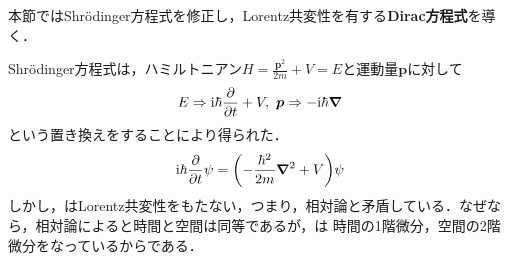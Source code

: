 \documentclass{report}
\begin{document}
本節ではShrödinger方程式を修正し，Lorentz共変性を有する\textbf{Dirac方程式}を導く．

Shrödinger方程式は，ハミルトニアン$H=\frac{\bm{p}^2}{2m} + V=E$と運動量$\bm{p}$に対して
\begin{align}
  E \Rightarrow \mathrm{i}\hbar\frac{\partial}{\partial t} + V,\ \bm{p} \Rightarrow -\mathrm{i}\hbar \grad 
\end{align}
という置き換えをすることにより得られた．
\begin{align}
  \mathrm{i}\hbar \frac{\partial}{\partial t}\psi = \qty(-\frac{\hbar^2}{2m}\grad^2 + V)\psi   \label{TDSE}
\end{align}
しかし，はLorentz共変性をもたない，つまり，相対論と矛盾している．なぜなら，相対論によると時間と空間は同等であるが，は
時間の1階微分，空間の2階微分をなっているからである．
\end{document}
